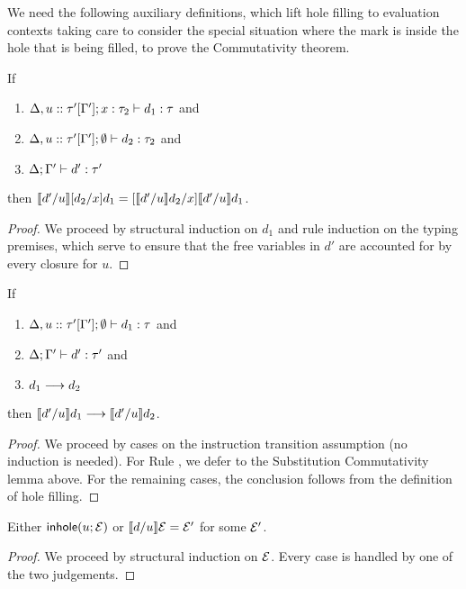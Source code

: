 We need the following auxiliary definitions, which lift hole filling to evaluation contexts taking care to consider the special situation where the mark is inside the hole that is being filled, to prove the Commutativity theorem.

\begin{lem}
  If 
  \begin{enumerate}[nolistsep]
  	\item $\Delta, u :: \tau'[\Gamma']; x : \tau_2 \vdash d_1 : \tau$ and 
  	\item $\Delta, u :: \tau'[\Gamma']; \emptyset \vdash d_2 : \tau_2$ and 
  	\item $\Delta; \Gamma' \vdash d' : \tau'$
  \end{enumerate}

  then  $\llbracket d' / u\rrbracket [d_2/x]d_1 = [\llbracket d' / u\rrbracket d_2/x]\llbracket d' / u\rrbracket d_1$.
\end{lem}
\begin{proof}
We proceed by structural induction on $d_1$ and rule induction on the typing premises, which serve to ensure that the free
variables in $d'$ are accounted for by every closure for $u$.
\end{proof}

\begin{lem}
  If 
  \begin{enumerate}[nolistsep]
  	\item $\Delta, u :: \tau'[\Gamma']; \emptyset \vdash d_1 : \tau$ and 
  	\item $\Delta; \Gamma' \vdash d' : \tau'$ and 
  	\item $d_1 \longrightarrow d_2$
  \end{enumerate}

  then $\llbracket d' / u\rrbracket d_1 \longrightarrow \llbracket d' / u\rrbracket d_2$.
\end{lem}
\begin{proof}
We proceed by cases on the instruction transition assumption (no induction is needed). For Rule , we defer to the Substitution Commutativity lemma above. For the remaining cases, the conclusion follows from the definition of hole filling.
\end{proof}

\begin{lem}
Either $\mathsf{inhole}(u; \mathcal{E})$ or $\llbracket d / u\rrbracket \mathcal{E}=\mathcal{E}'$ for some $\mathcal{E}'$.
\end{lem}
\begin{proof} We proceed by structural induction on $\mathcal{E}$. Every case is handled by one of the two judgements. \end{proof}

